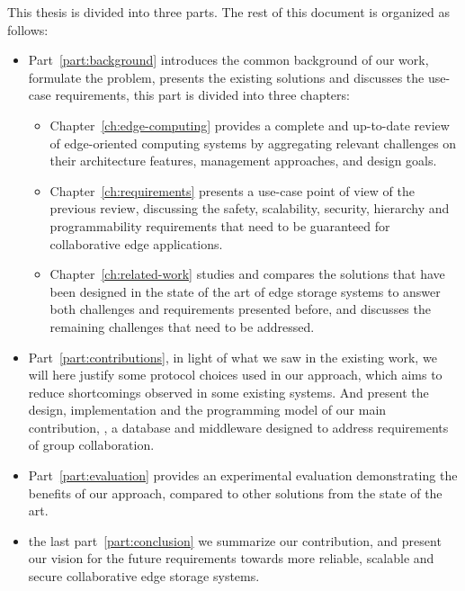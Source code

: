 This thesis is divided into three parts. 
The rest of this document is organized as follows:
\begin{itemize}
  \item Part~\ref{part:background} introduces the common background of our work,
  formulate the problem, presents the existing solutions and discusses the use-case
  requirements, this part is divided into three chapters:
  \begin{itemize}
    \item Chapter~\ref{ch:edge-computing} provides a complete and up-to-date 
    review of edge-oriented computing systems by aggregating relevant challenges 
    on their architecture features, management approaches, and design goals.
    \item Chapter~\ref{ch:requirements} presents a use-case point of view of the
    previous review, discussing the safety, scalability, security, hierarchy and 
    programmability requirements that need to be guaranteed for collaborative 
    edge applications.
    \item Chapter~\ref{ch:related-work} studies and compares the solutions that have
    been designed in the state of the art of edge storage systems
    to answer both challenges and requirements presented before,
    and discusses the remaining challenges that need to be addressed.
  \end{itemize}
  \item Part~\ref{part:contributions}, in light of what we saw in the existing work, 
  we will here justify some protocol choices used in our approach, 
  which aims to reduce shortcomings observed in some existing systems.
  And present the design, implementation and the programming model of our
  main contribution, \system{}, a database and middleware designed to address
  requirements of group collaboration.
  \item Part~\ref{part:evaluation} provides an experimental evaluation 
  demonstrating the benefits of our approach, compared to other solutions 
  from the state of the art.
  \item the last part~\ref{part:conclusion} we summarize our contribution, and 
  present our vision for the future requirements towards more reliable,
  scalable and secure collaborative edge storage systems.
\end{itemize}
